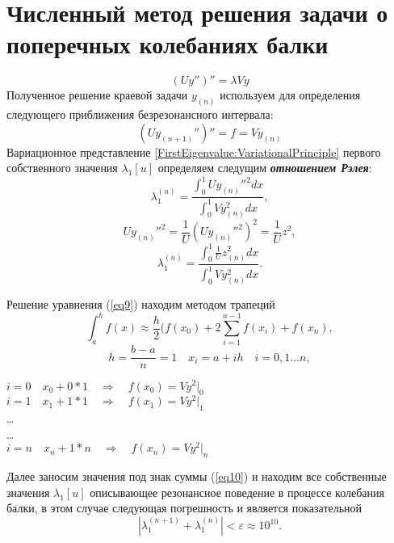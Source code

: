\section{Численный метод решения задачи о поперечных колебаниях балки}
\label{section:NumericalMethod:EVP}

\begin{equation*}  
(Uy'')''=\lambda Vy
\end{equation*}
Полученное решение краевой задачи  \(y_{(n)}\) используем для определения следующего приближения безрезонансного интервала:
\begin{equation*}  
(Uy_{(n+1)}'')''=f=Vy_{(n)}
\end{equation*}
%
%
%
%
Вариационное представление
\eqref{FirstEigenvalue:VariationalPrinciple}
первого собственного значения $\lambda_1[u]$
определяем следущим \emph{\textbf{отношением Рэлея}}:
%
%
%
%
\begin{equation*}  
\lambda_1^{(n)}=\frac{\int_{0}^{1}Uy_{(n)}''^2dx}{\int_{0}^{1}Vy_{(n)}^2dx},
\end{equation*}
\begin{equation*}  
Uy_{(n)}''^2=\frac{1}{U}(Uy_{(n)}''^2)^2=\frac{1}{U}z^2,
\end{equation*}
\begin{equation}\label{eq9}   
\lambda_1^{(n)}=\frac{\int_{0}^{1}\frac{1}{U}z_{(n)}^2dx}{\int_{0}^{1}Vy_{(n)}^2dx}.
\end{equation}


Решение уравнения (\ref{eq9}) находим методом трапеций\\
\begin{equation}\label{eq10} 
\int_a^bf(x)\approx\frac{h}{2}(f(x_0)+2\sum\limits_{i=1}^{n-1} f(x_i) +f(x_n),
\end{equation}
\begin{equation*}  
h=\frac{b-a}{n}=1 \quad  x_i=a+ih \quad  i=0,1\ldots n,
\end{equation*}
\begin{center}  
\(i=0 \quad x_0+0*1\quad \Rightarrow\quad f(x_0)=Vy^2\bigg|_0\)\\
\(i=1 \quad x_1+1*1\quad \Rightarrow\quad f(x_1)=Vy^2\bigg|_1\)\\
\ldots\\
\ldots\\
\(i=n \quad x_n+1*n\quad \Rightarrow\quad f(x_n)=Vy^2\bigg|_n\)
\end{center}
\par
Далее заносим значения под знак суммы (\ref{eq10}) и находим все собственные значения $\lambda_1[u]$ описывающее резонансное поведение в процессе колебания балки, в этом случае следующая погрешность и является показательной
\begin{equation*}  
|\lambda_1^{(n+1)} + \lambda_1^{(n)}|<\varepsilon\approx 10^{10}.
\end{equation*}